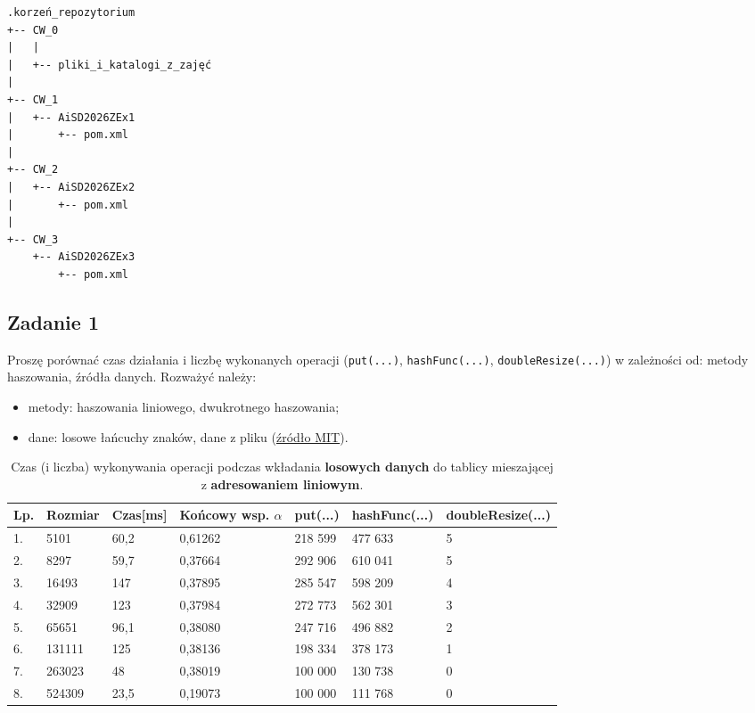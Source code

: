 \documentclass[twoside]{article}
\begin{document}
\begin{verbatim}
.korzeń_repozytorium
+-- CW_0
|   |
|   +-- pliki_i_katalogi_z_zajęć
|
+-- CW_1
|   +-- AiSD2026ZEx1
|       +-- pom.xml
|
+-- CW_2
|   +-- AiSD2026ZEx2
|       +-- pom.xml
|
+-- CW_3
    +-- AiSD2026ZEx3
        +-- pom.xml
\end{verbatim}

\newpage

\subsection{Zadanie 1}

Proszę porównać czas działania i liczbę wykonanych operacji (\verb|put(...)|, \verb|hashFunc(...)|,
\verb|doubleResize(...)|) w zależności od: metody haszowania, źródła danych.
Rozważyć należy:
\begin{itemize}
    \item metody: haszowania liniowego, dwukrotnego haszowania;
    \item dane: losowe łańcuchy znaków, dane z pliku 
(\href{https://www.mit.edu/~ecprice/wordlist.100000}{źródło MIT}).
\end{itemize}

\begin{table}[h]
\begin{tabular}{|l|l|l|l||l|l|l|}
\hline
Lp. & Rozmiar & Czas[ms] & Końcowy wsp. $\alpha$ & put(...) & hashFunc(...) & doubleResize(...) \\ \hline
1. & 5101 & 60,2 & 0,61262 & 218 599 & 477 633 & 5 \\ \hline
2. & 8297 & 59,7 & 0,37664 & 292 906 & 610 041 & 5 \\ \hline
3. & 16493 & 147 & 0,37895 & 285 547 & 598 209 & 4 \\ \hline
4. & 32909 & 123 & 0,37984 & 272 773 & 562 301 & 3 \\ \hline
5. & 65651 & 96,1 & 0,38080 & 247 716 & 496  882 & 2 \\ \hline
6. & 131111 & 125 & 0,38136 & 198 334 & 378 173 & 1 \\ \hline
7. & 263023 & 48 & 0,38019 & 100 000 & 130 738 & 0 \\ \hline
8. & 524309 & 23,5 & 0,19073 & 100 000 & 111 768 & 0 \\ \hline
\end{tabular}
\caption{Czas (i liczba) wykonywania operacji podczas wkładania \textbf{losowych danych} do
tablicy mieszającej z \textbf{adresowaniem liniowym}.}
\end{table}
\end{document}
